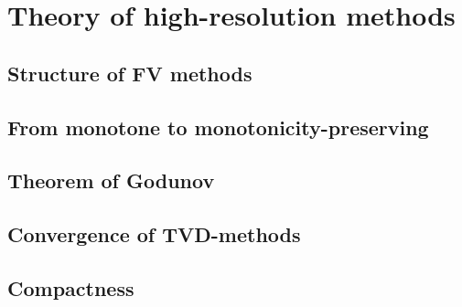 \section{Theory of high-resolution methods}


\subsection{Structure of FV methods}


\subsection{From monotone to monotonicity-preserving}


\subsection{Theorem of Godunov}


\subsection{Convergence of TVD-methods}


\subsection{Compactness}